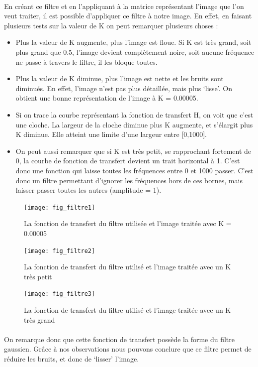 \documentclass{article}
\begin{document}
\paragraph{}
\justifying
En créant ce filtre et en l’appliquant à la matrice représentant l’image que l’on veut traiter, il est possible d’appliquer ce filtre à notre image.
En effet, en faisant plusieurs tests sur la valeur de K on peut remarquer plusieurs choses :
\begin{itemize}
\item Plus la valeur de K augmente, plus l’image est floue. Si K est très grand, soit plus grand que 0.5, l’image devient complètement noire, soit aucune fréquence ne passe à travers le filtre, il les bloque toutes.
\item Plus la valeur de K diminue, plus l’image est nette et les bruits sont diminués. En effet, l’image n’est pas plus détaillée, mais plus ‘lisse’. On obtient une bonne représentation de l’image à K = 0.00005.
\item Si on trace la courbe représentant la fonction de transfert H, on voit que c’est une cloche. La largeur de la cloche diminue plus K augmente, et s’élargit plus K diminue. Elle atteint une limite d’une largeur entre [0,1000].
\item On peut aussi remarquer que si K est très petit, se rapprochant fortement de 0, la courbe de fonction de transfert devient un trait horizontal à 1. C’est donc une fonction qui laisse toutes les fréquences entre 0 et 1000 passer. C’est donc un filtre permettant d’ignorer les fréquences hors de ces bornes, mais laisser passer toutes les autres (amplitude = 1).
\end{itemize}
\begin{figure}[h]
\texttt{[image: fig\_filtre1]}
\centering
\caption{La fonction de transfert du filtre utilisée et l'image traitée avec K = 0.00005}
\end{figure}
\begin{figure}
\texttt{[image: fig\_filtre2]}
\centering
\caption {La fonction de transfert du filtre utilisé et l'image traitée avec un K très petit}
\end{figure}
\begin{figure}
\texttt{[image: fig\_filtre3]}
\centering
\caption {La fonction de transfert du filtre utilisé et l'image traitée avec un K très grand}
\end{figure}
\paragraph{}
\newpage
\justifying
On remarque donc que cette fonction de transfert possède la forme du filtre gaussien. Grâce à nos observations nous pouvons conclure que ce filtre permet de réduire les bruits, et donc de ‘lisser’ l’image. 
\end{document}
